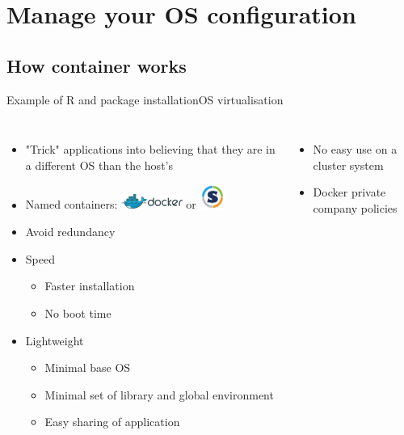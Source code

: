 \section{Manage your OS configuration}
\subsection{How container works}

\begin{frame}{Example of R and package installation}{OS virtualisation}
\begin{columns}
\begin{itemize}[<+->]
	\item "Trick" applications into believing that they are in a different OS than the host’s
	\item Named containers: \includegraphics[width=2cm, height=0.5cm]{images/docker_logo2.png} or \includegraphics[width=0.8cm, height=0.8cm]{images/singularity_logo.pdf}
	\item Avoid redundancy
	\item<5-> Speed
	\begin{itemize}[<5->]
		\item Faster installation
		\item No boot time
	\end{itemize}
	\item<6-> Lightweight
	\begin{itemize}[<6->]
		\item Minimal base OS
		\item Minimal set of library and global environment 
		\item Easy sharing of application 
	\end{itemize}	
\end{itemize}
\begin{itemize}[<8->]
	\item No easy use on a cluster system
	\item Docker private company policies
\end{itemize}
\end{columns}


\end{frame}
